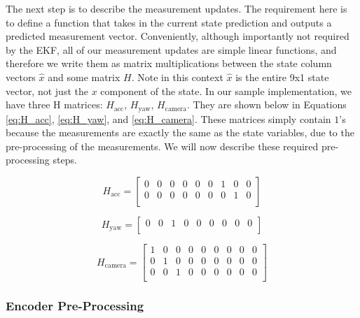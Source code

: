 \documentclass{article}
\begin{document}
    The next step is to describe the measurement updates. The requirement here is to define a function that takes in the current state prediction and outputs a predicted measurement vector. Conveniently, although importantly not required by the EKF, all of our measurement updates are simple linear functions, and therefore we write them as matrix multiplications between the state column vectors $\hat{x}$ and some matrix $H$. Note in this context $\hat{x}$ is the entire 9x1 state vector, not just the $x$ component of the state. In our sample implementation, we have three H matrices: $H_{\text{acc}}$, $H_{\text{yaw}}$, $H_{\text{camera}}$. They are shown below in Equations \ref{eq:H_acc}, \ref{eq:H_yaw}, and \ref{eq:H_camera}. These matrices simply contain $1$'s because the measurements are exactly the same as the state variables, due to the pre-processing of the measurements. We will now describe these required pre-processing steps.

    \begin{equation} \label{eq:H_acc}
      H_{\text{acc}} =
      \begin{bmatrix}
        0 & 0 & 0 & 0 & 0 & 0 & 1 & 0 & 0 \\
        0 & 0 & 0 & 0 & 0 & 0 & 0 & 1 & 0 \\
      \end{bmatrix}
    \end{equation}

    \begin{equation} \label{eq:H_yaw}
      H_{\text{yaw}} =
      \begin{bmatrix}
        0 & 0 & 1 & 0 & 0 & 0 & 0 & 0 & 0 \\
      \end{bmatrix}
    \end{equation}

    \begin{equation} \label{eq:H_camera}
      H_{\text{camera}} =
      \begin{bmatrix}
        1 & 0 & 0 & 0 & 0 & 0 & 0 & 0 & 0 \\
        0 & 1 & 0 & 0 & 0 & 0 & 0 & 0 & 0 \\
        0 & 0 & 1 & 0 & 0 & 0 & 0 & 0 & 0 \\
      \end{bmatrix}
    \end{equation}

    \subsubsection{Encoder Pre-Processing}
\end{document}
